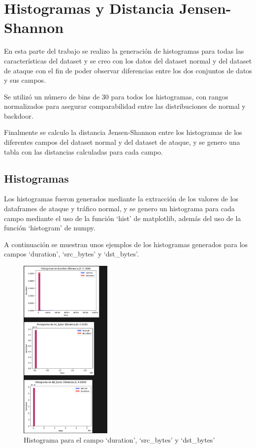 \documentclass[12pt,a4paper]{article}
\begin{document}
\section{Histogramas y Distancia Jensen-Shannon}\label{sec:histogramas-y-distancia-jensen-shannon}

En esta parte del trabajo se realizo la generación de histogramas para todas las
características del dataset y se creo con los datos del dataset normal y
del dataset de ataque con el fin de poder observar diferencias entre los dos conjuntos de datos y sus campos.

Se utilizó un número de bins de 30 para todos los histogramas, con rangos normalizados
para asegurar comparabilidad entre las distribuciones de normal y backdoor.

Finalmente se calculo la distancia Jensen-Shannon entre los histogramas de los diferentes campos del dataset normal y del dataset de ataque,
y se genero una tabla con las distancias calculadas para cada campo.

\subsection{Histogramas}\label{subsec:histogramas}

Los histogramas fueron generados mediante la extracción de los valores de los dataframes de ataque y tráfico normal,
y se genero un histograma para cada campo mediante el uso de la función `hist' de matplotlib, además del uso
de la función `histogram' de numpy.

A continuación se muestran unos ejemplos de los histogramas generados para los campos `duration', `src_bytes' y `dst_bytes'.

\begin{figure}[htpb]
  \centering
  \includegraphics[width=0.4\textwidth]{images/histogramas}
  \caption{Histograma para el campo `duration', `src_bytes' y `dst_bytes'}\label{fig:figure}
\end{figure}
\end{document}
